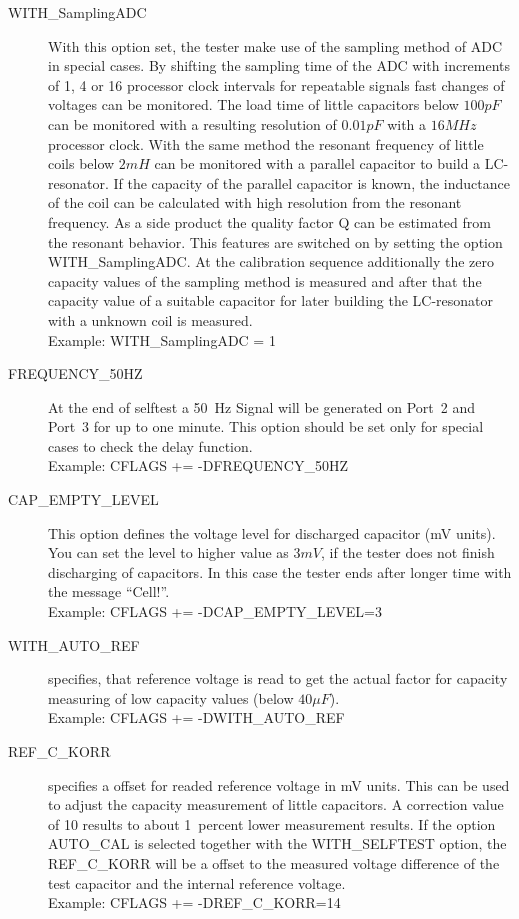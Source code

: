 \begin{description}
  \item[WITH\_SamplingADC] With this option set, the tester make use of the sampling method of ADC in special cases.
By shifting the sampling time of the ADC with increments of 1, 4 or 16 processor clock intervals for repeatable signals
fast changes of voltages can be monitored.
The load time of little capacitors below \(100pF\) can be monitored with a resulting resolution of \(0.01pF\) with a \(16MHz\) processor clock.
With the same method the resonant frequency of little coils below \(2mH\) can be monitored with a parallel capacitor to build a LC-resonator.
If the capacity of the parallel capacitor is known, the inductance of the coil can be calculated with high resolution from
the resonant frequency. As a side product the quality factor Q can be estimated from the resonant behavior.
This features are switched on by setting the option WITH\_SamplingADC.
At the calibration sequence additionally the zero capacity values of the sampling method is measured and
after that the capacity value of a suitable capacitor for later building the LC-resonator with a unknown coil is measured.\\
Example: WITH\_SamplingADC = 1

  \item[FREQUENCY\_50HZ] At the end of selftest a 50~Hz Signal will be generated on Port~2 and Port~3 for up to one minute.
 This option should be set only for special cases to check the delay function.\\
Example: CFLAGS += -DFREQUENCY\_50HZ

  \item[CAP\_EMPTY\_LEVEL]  This option defines the voltage level for discharged capacitor (mV units).
You can set the level to higher value as \(3mV\), if the tester does not finish discharging of capacitors.
In this case the tester ends after longer time with the message ``Cell!''.\\
Example: CFLAGS += -DCAP\_EMPTY\_LEVEL=3

  \item[WITH\_AUTO\_REF] specifies, that reference voltage is read to get the actual factor for capacity measuring of low capacity values (below \(40\mu F\)).\\
Example:  CFLAGS += -DWITH\_AUTO\_REF

  \item[REF\_C\_KORR] specifies a offset for readed reference voltage in mV units.
This can be used to adjust the capacity measurement of little capacitors.
A correction value of 10 results to about 1~percent lower measurement results.
If the option AUTO\_CAL is selected together with the WITH\_SELFTEST option, the REF\_C\_KORR will be
a offset to the measured voltage difference of the test capacitor and the internal reference voltage.\\
Example:  CFLAGS += -DREF\_C\_KORR=14


\end{description}
